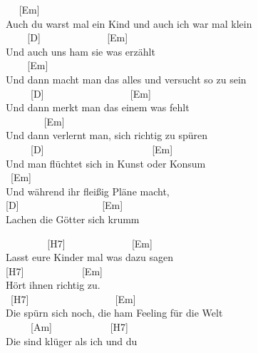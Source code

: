 \documentclass[
  letterpaper,
]{scrbook}
\begin{document}
~ ~{[}Em{]}\\
Auch du warst mal ein Kind und auch ich war mal klein\\
\hspace*{0.333em} ~ ~ ~{[}D{]} ~ ~ ~ ~ ~ ~ ~ ~{[}Em{]}\\
Und auch uns ham sie was erzählt\\
\hspace*{0.333em} ~ ~ ~{[}Em{]}\\
Und dann macht man das alles und versucht so zu sein\\
\hspace*{0.333em} ~ ~ ~ {[}D{]} ~ ~ ~ ~ ~ ~ ~ ~ ~ ~ {[}Em{]}\\
Und dann merkt man das einem was fehlt\\
\hspace*{0.333em} ~ ~ ~ ~ ~{[}Em{]}\\
Und dann verlernt man, sich richtig zu spüren\\
\hspace*{0.333em} ~ ~ ~ {[}D{]} ~ ~ ~ ~ ~ ~ ~ ~ ~ ~ ~ ~ ~{[}Em{]}\\
Und man flüchtet sich in Kunst oder Konsum\\
\hspace*{0.333em} ~{[}Em{]}\\
Und während ihr fleißig Pläne macht,\\
{[}D{]} ~ ~ ~ ~ ~ ~ ~ ~ ~ ~{[}Em{]}\\
Lachen die Götter sich krumm

~ ~ ~ ~ ~ {[}H7{]} ~ ~ ~ ~ ~ ~ ~ ~{[}Em{]}\\
Lasst eure Kinder mal was dazu sagen\\
{[}H7{]} ~ ~ ~ ~ ~ ~ ~{[}Em{]}\\
Hört ihnen richtig zu.\\
\hspace*{0.333em} ~{[}H7{]} ~ ~ ~ ~ ~ ~ ~ ~ ~ ~ {[}Em{]}\\
Die spürn sich noch, die ham Feeling für die Welt\\
\hspace*{0.333em} ~ ~ ~ {[}Am{]} ~ ~ ~ ~ ~ ~ ~{[}H7{]}\\
Die sind klüger als ich und du
\end{document}
